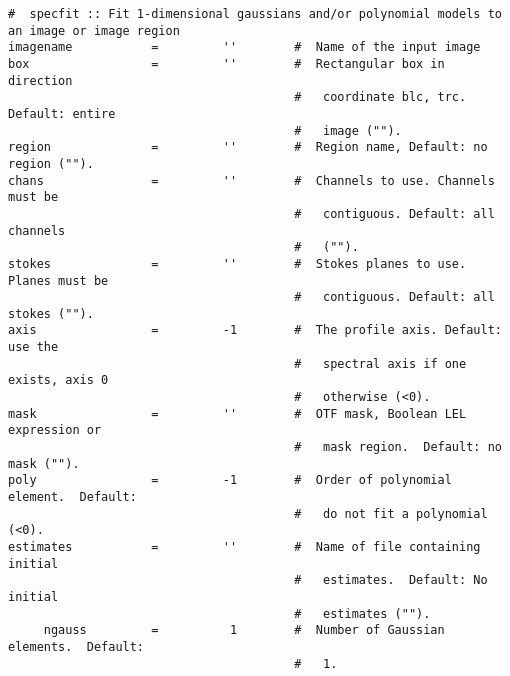 \small
\begin{verbatim}
#  specfit :: Fit 1-dimensional gaussians and/or polynomial models to an image or image region
imagename           =         ''        #  Name of the input image
box                 =         ''        #  Rectangular box in direction
                                        #   coordinate blc, trc. Default: entire
                                        #   image ("").
region              =         ''        #  Region name, Default: no region ("").
chans               =         ''        #  Channels to use. Channels must be
                                        #   contiguous. Default: all channels
                                        #   ("").
stokes              =         ''        #  Stokes planes to use. Planes must be
                                        #   contiguous. Default: all stokes ("").
axis                =         -1        #  The profile axis. Default: use the
                                        #   spectral axis if one exists, axis 0
                                        #   otherwise (<0).
mask                =         ''        #  OTF mask, Boolean LEL expression or
                                        #   mask region.  Default: no mask ("").
poly                =         -1        #  Order of polynomial element.  Default:
                                        #   do not fit a polynomial (<0).
estimates           =         ''        #  Name of file containing initial
                                        #   estimates.  Default: No initial
                                        #   estimates ("").
     ngauss         =          1        #  Number of Gaussian elements.  Default:
                                        #   1.


\end{verbatim}
